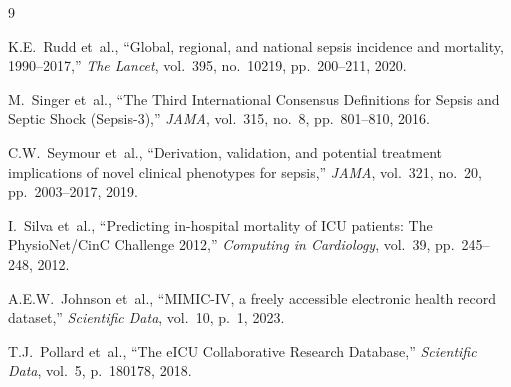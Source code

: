 \documentclass[11pt,a4paper]{article}
\begin{document}

\begin{thebibliography}{9}

K.E.~Rudd et~al., ``Global, regional, and national sepsis incidence and mortality, 1990--2017,'' \emph{The Lancet}, vol.~395, no.~10219, pp.~200--211, 2020.

M.~Singer et~al., ``The Third International Consensus Definitions for Sepsis and Septic Shock (Sepsis-3),'' \emph{JAMA}, vol.~315, no.~8, pp.~801--810, 2016.

C.W.~Seymour et~al., ``Derivation, validation, and potential treatment implications of novel clinical phenotypes for sepsis,'' \emph{JAMA}, vol.~321, no.~20, pp.~2003--2017, 2019.

I.~Silva et~al., ``Predicting in-hospital mortality of ICU patients: The PhysioNet/CinC Challenge 2012,'' \emph{Computing in Cardiology}, vol.~39, pp.~245--248, 2012.

A.E.W.~Johnson et~al., ``MIMIC-IV, a freely accessible electronic health record dataset,'' \emph{Scientific Data}, vol.~10, p.~1, 2023.

T.J.~Pollard et~al., ``The eICU Collaborative Research Database,'' \emph{Scientific Data}, vol.~5, p.~180178, 2018.

\end{thebibliography}
\end{document}
